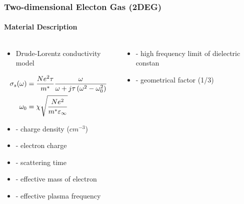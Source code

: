 \documentclass[mathserif,18pt,xcolor=table]{beamer}
\begin{document}
  \begin{frame}
    \frametitle{Two-dimensional Electon Gas (2DEG)}
    \framesubtitle{Material Description}
    \begin{columns}[T] %
      \begin{column}{.5\textwidth}
        \begin{itemize}
          \item Drude-Lorentz conductivity model
        \end{itemize}
        \begin{subequations} \nonumber
          \begin{align}
            \sigma_s(\O) &= \frac{N e^2 \tau}{m^{\ast}}\frac{\O}{\O + j \tau \left(\O^2 - \O_0^2\right)}
            \label{eq:conductivity}\\
            \O_0 &= \mathrm{\chi}\sqrt{\frac{N e^2}{m^{\ast} \E_{\inf}}}
            \label{eq:plasma_f}
          \end{align}
          \label{eq:eq_currents}
        \end{subequations}
        \begin{itemize}
          \item[]{ - charge density ($cm^{-3}$)}
          \item[]{ - electron charge}
          \item[]{\makebox[.3cm][l]{$\tau$} - scattering time}
          \item[]{ - effective mass of electron}
          \item[]{ - effective plasma frequency}
        \end{itemize}
      \end{column}
      \begin{column}[T]{.5\textwidth}
        \begin{figure}
          \vspace*{-1cm}
          
          \label{fig:disp}
        \end{figure}
        \begin{itemize}
          \item[]{\makebox[.3cm][l]{$\E_{\inf}$} - high frequency limit of dielectric constan}
          \item[]{\makebox[.3cm][l]{$\chi$} - geometrical factor (1/3)}
        \end{itemize}
      \end{column}
    \end{columns}
  \end{frame}
\end{document}
